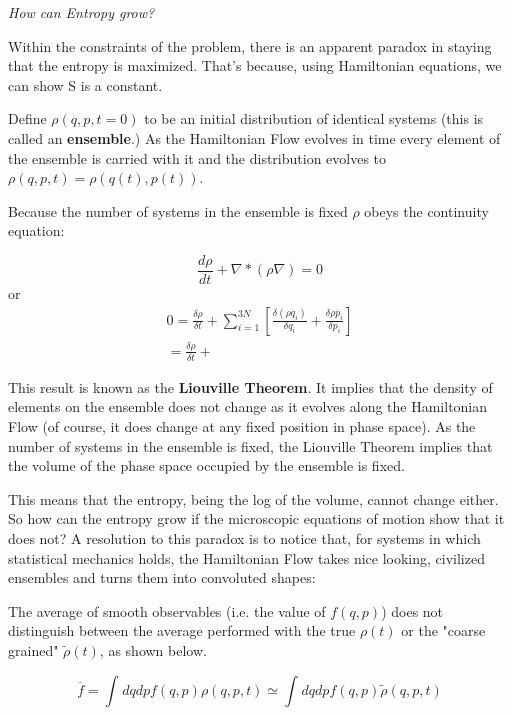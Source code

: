 \documentclass{book}
\newcommand{\pardif}[2]{\frac{\delta#1}{\delta#2}}
\newcommand{\dif}[2]{\frac{d#1}{d#2}}
\begin{document}
\textit{How can Entropy grow?}

Within the constraints of the problem, there is an apparent paradox in staying that the entropy is maximized.  That's because, using Hamiltonian equations, we can show S is a constant.

Define $\rho(q,p,t=0)$ to be an initial distribution of identical systems (this is called an \textbf{ensemble}.)  As the Hamiltonian Flow evolves in time every element of the ensemble is carried with it and the distribution evolves to $\rho(q,p,t)=\rho(q(t),p(t))$.


Because the number of systems in the ensemble is fixed $\rho$ obeys the continuity equation:

$$\dif{\rho}{t}+\nabla*(\rho\nabla)=0$$
or
\begin{equation}
\begin{split}
0=\pardif{\rho}{t}+\sum_{i=1}^{3N}[\pardif{(\rho\dot{q_{i}})}{q_{i}}+\pardif{\rho\dot{p_{i}}}{p_{i}}] \\
	=\pardif{\rho}{t}+
\end{split}	 
\end{equation}

This result is known as the \textbf{Liouville Theorem}.  It implies that the density of elements on the ensemble does not change as it evolves along the Hamiltonian Flow (of course, it does change at any fixed position in phase space).  As the number of systems in the ensemble is fixed, the Liouville Theorem implies that the volume of the phase space occupied by the ensemble is fixed.  

This means that the entropy, being the log of the volume, cannot change either.  So how can the entropy grow if the microscopic equations of motion show that it does not?  A resolution to this paradox is to notice that, for systems in which statistical mechanics holds, the Hamiltonian Flow takes nice looking, civilized ensembles and turns them into convoluted shapes:


The average of smooth observables (i.e. the value of $f(q,p)$) does not distinguish between the average performed with the true $\rho(t)$ or the "coarse grained" $\widetilde{\rho}(t)$, as shown below.


$$\overline{f}=\int_{}^{}dqdpf(q,p)\rho(q,p,t)\simeq\int_{}^{}dqdpf(q,p)\widetilde{\rho}(q,p,t)$$
\end{document}
